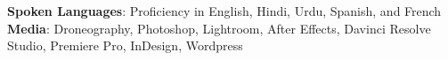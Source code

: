 % 
% 
% 
% 
% 
% 

\begin{itemize}[leftmargin=0in, label={}]
    \small{\item{
     \textbf{Spoken Languages}{: Proficiency in English, Hindi, Urdu, Spanish,
     and
     French} \\
     \textbf{Media}{: Droneography, Photoshop, Lightroom, After Effects, Davinci Resolve Studio, 
     Premiere Pro, InDesign, Wordpress} \\
     
    }}
\end{itemize}
